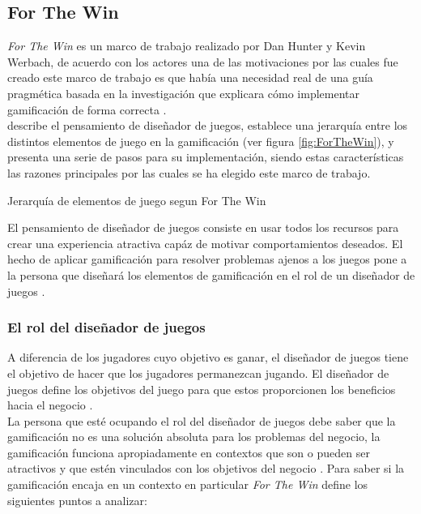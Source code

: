 \subsection{For The Win} \label{sec:ForTheWin}

 {\em For The Win} es un marco de trabajo realizado por Dan Hunter y Kevin Werbach, de acuerdo
 con los actores una de las motivaciones por las cuales fue creado este marco de trabajo es que
 había una necesidad real de una guía pragmética basada en la investigación que explicara cómo
 implementar gamificación de forma correcta \cite{ForTheWin}.\\
 
  describe el pensamiento de diseñador de juegos, establece una
 jerarquía entre los distintos elementos de juego en la gamificación (ver figura \ref{fig:ForTheWin}),
 y presenta una serie de pasos para su implementación, siendo estas características las razones
 principales por las cuales se ha elegido este marco de trabajo.

        {Jerarquía de elementos de juego segun For The Win}

 \noindent El pensamiento de diseñador de juegos consiste en usar todos los recursos para
 crear una experiencia atractiva capáz de motivar comportamientos deseados. El hecho de
 aplicar gamificación para resolver problemas ajenos a los juegos pone a la persona que
 diseñará los elementos de gamificación en el rol de un diseñador de juegos \cite[p. 29]{ForTheWin}.


\subsubsection{El rol del diseñador de juegos}

 \noindent A diferencia de los jugadores cuyo objetivo es ganar, el diseñador de juegos
 tiene el objetivo de hacer que los jugadores permanezcan jugando. El diseñador de juegos
 define los objetivos del juego para que estos proporcionen los beneficios hacia el negocio
 \cite[p. 29]{ForTheWin}.\\

 \noindent La persona que esté ocupando el rol del diseñador de juegos debe saber que la
 gamificación no es una solución absoluta para los problemas del negocio, la gamificación
 funciona apropiadamente en contextos que son o pueden ser atractivos y que estén vinculados
 con los objetivos del negocio \cite[p. 30]{ForTheWin}. Para saber si la gamificación encaja
 en un contexto en particular {\em For The Win} define los siguientes puntos a analizar:

